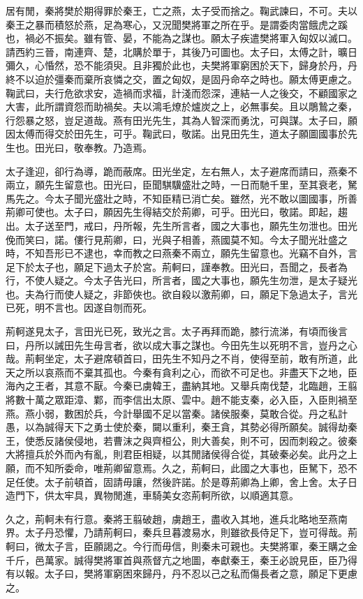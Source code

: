 居有閒，秦將樊於期得罪於秦王，亡之燕，太子受而捨之。鞠武諫曰，不可。夫以秦王之暴而積怒於燕，足為寒心，又況聞樊將軍之所在乎。是謂委肉當餓虎之蹊也，禍必不振矣。雖有管、晏，不能為之謀也。願太子疾遣樊將軍入匈奴以滅口。請西約三晉，南連齊、楚，北購於單于，其後乃可圖也。太子曰，太傅之計，曠日彌久，心惛然，恐不能須臾。且非獨於此也，夫樊將軍窮困於天下，歸身於丹，丹終不以迫於彊秦而棄所哀憐之交，置之匈奴，是固丹命卒之時也。願太傅更慮之。鞠武曰，夫行危欲求安，造禍而求福，計淺而怨深，連結一人之後交，不顧國家之大害，此所謂資怨而助禍矣。夫以鴻毛燎於爐炭之上，必無事矣。且以鵰鷙之秦，行怨暴之怒，豈足道哉。燕有田光先生，其為人智深而勇沈，可與謀。太子曰，願因太傅而得交於田先生，可乎。鞠武曰，敬諾。出見田先生，道太子願圖國事於先生也。田光曰，敬奉教。乃造焉。

太子逢迎，卻行為導，跪而蔽席。田光坐定，左右無人，太子避席而請曰，燕秦不兩立，願先生留意也。田光曰，臣聞騏驥盛壯之時，一日而馳千里，至其衰老，駑馬先之。今太子聞光盛壯之時，不知臣精已消亡矣。雖然，光不敢以圖國事，所善荊卿可使也。太子曰，願因先生得結交於荊卿，可乎。田光曰，敬諾。即起，趨出。太子送至門，戒曰，丹所報，先生所言者，國之大事也，願先生勿泄也。田光俛而笑曰，諾。僂行見荊卿，曰，光與子相善，燕國莫不知。今太子聞光壯盛之時，不知吾形已不逮也，幸而教之曰燕秦不兩立，願先生留意也。光竊不自外，言足下於太子也，願足下過太子於宮。荊軻曰，謹奉教。田光曰，吾聞之，長者為行，不使人疑之。今太子告光曰，所言者，國之大事也，願先生勿泄，是太子疑光也。夫為行而使人疑之，非節俠也。欲自殺以激荊卿，曰，願足下急過太子，言光已死，明不言也。因遂自刎而死。

荊軻遂見太子，言田光已死，致光之言。太子再拜而跪，膝行流涕，有頃而後言曰，丹所以誡田先生毋言者，欲以成大事之謀也。今田先生以死明不言，豈丹之心哉。荊軻坐定，太子避席頓首曰，田先生不知丹之不肖，使得至前，敢有所道，此天之所以哀燕而不棄其孤也。今秦有貪利之心，而欲不可足也。非盡天下之地，臣海內之王者，其意不厭。今秦已虜韓王，盡納其地。又舉兵南伐楚，北臨趙，王翦將數十萬之眾距漳、鄴，而李信出太原、雲中。趙不能支秦，必入臣，入臣則禍至燕。燕小弱，數困於兵，今計舉國不足以當秦。諸侯服秦，莫敢合從。丹之私計愚，以為誠得天下之勇士使於秦，闚以重利，秦王貪，其勢必得所願矣。誠得劫秦王，使悉反諸侯侵地，若曹沫之與齊桓公，則大善矣，則不可，因而刺殺之。彼秦大將擅兵於外而內有亂，則君臣相疑，以其閒諸侯得合從，其破秦必矣。此丹之上願，而不知所委命，唯荊卿留意焉。久之，荊軻曰，此國之大事也，臣駑下，恐不足任使。太子前頓首，固請毋讓，然後許諾。於是尊荊卿為上卿，舍上舍。太子日造門下，供太牢具，異物閒進，車騎美女恣荊軻所欲，以順適其意。

久之，荊軻未有行意。秦將王翦破趙，虜趙王，盡收入其地，進兵北略地至燕南界。太子丹恐懼，乃請荊軻曰，秦兵旦暮渡易水，則雖欲長侍足下，豈可得哉。荊軻曰，微太子言，臣願謁之。今行而毋信，則秦未可親也。夫樊將軍，秦王購之金千斤，邑萬家。誠得樊將軍首與燕督亢之地圖，奉獻秦王，秦王必說見臣，臣乃得有以報。太子曰，樊將軍窮困來歸丹，丹不忍以己之私而傷長者之意，願足下更慮之。

